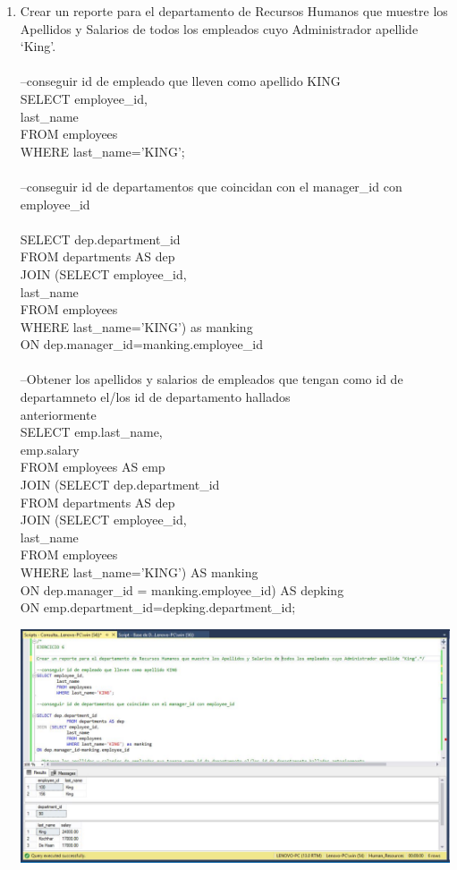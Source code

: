 \begin{enumerate}[1.]
	\item Crear un reporte para el departamento de Recursos Humanos que muestre los Apellidos y Salarios de todos los empleados cuyo Administrador apellide ‘King’.
	\\
\\--conseguir id de empleado que lleven como apellido KING
\\SELECT employee\_id,
\\		last\_name
\\		FROM employees
\\		WHERE last\_name='KING';
\\
\\--conseguir id de departamentos que coincidan con el manager\_id con employee\_id
\\
\\SELECT dep.department\_id
\\			FROM departments AS dep
\\JOIN (SELECT employee\_id,
\\			last\_name
\\			FROM employees
\\			WHERE last\_name='KING') as manking
\\ON dep.manager\_id=manking.employee\_id
\\
\\--Obtener los apellidos y salarios de empleados que tengan como id de departamneto el/los id de departamento hallados \\anteriormente
\\SELECT emp.last\_name,
\\		emp.salary
\\		FROM employees AS emp
\\JOIN (SELECT dep.department\_id
\\		FROM departments AS dep
\\JOIN (SELECT employee\_id,
\\		last\_name
\\		FROM employees
\\		WHERE last\_name='KING') AS manking
\\	ON dep.manager\_id = manking.employee\_id) AS depking
\\ON emp.department\_id=depking.department\_id; \\

	\begin{center}
	\includegraphics[width=17cm]{./Imagenes/Actividad9-Ejercicio06} 
	\end{center}


\end{enumerate}
